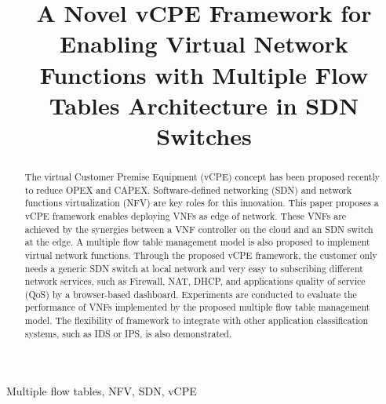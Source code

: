 \documentclass[conference]{IEEEtran}
\begin{document}
\title{A Novel vCPE Framework for Enabling Virtual Network Functions with Multiple Flow Tables Architecture in SDN Switches}

\author{

}

\makeatletter
\def\ps@IEEEtitlepagestyle{%
  \def\@oddfoot{\mycopyrightnotice}%
  \def\@evenfoot{}%
}
\def\mycopyrightnotice{%
  {\hfill \footnotesize 978-1-5386-1101-2/17/\$31.00~\copyright2017 IEEE \hfill}
}
\makeatother


\maketitle

\begin{abstract}
The virtual Customer Premise Equipment (vCPE) concept has been proposed recently to reduce OPEX and CAPEX. Software-defined networking (SDN) and network functions virtualization (NFV) are key roles for this innovation.
This paper proposes a vCPE framework enables deploying VNFs as edge of network.
These VNFs are achieved by the synergies between a VNF controller on the cloud and an SDN switch at the edge.
A multiple flow table management model is also proposed to implement virtual network functions.
Through the proposed vCPE framework, the customer only needs a generic SDN switch at local network and very easy to subscribing different network services, such as Firewall, NAT, DHCP, and applications quality of service (QoS) by a browser-based dashboard.
Experiments are conducted to evaluate the performance of VNFs implemented by the proposed multiple flow table management model.
The flexibility of framework to integrate with other application classification systems, such as IDS or IPS, is also demonstrated.

\end{abstract}

\begin{IEEEkeywords}
Multiple flow tables, NFV, SDN, vCPE
\end{IEEEkeywords}
\end{document}
